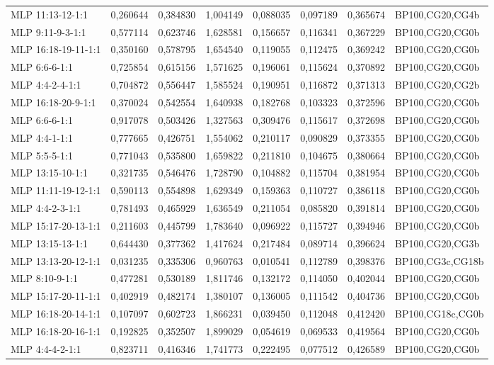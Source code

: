 \documentclass[10pt,oneside]{memoir}
\begin{document}
\begin{table}[htbp]
\begin{minipage}{\linewidth}
\begin{tabulary}{\linewidth}{@{}l@{}l@{}l@{}l@{}l@{}l@{}l@{}l@{}}
MLP 11:13-12-1:1&0,260644&0,384830&1,004149&0,088035&0,097189&0,365674&BP100,CG20,CG4b \\
MLP 9:11-9-3-1:1&0,577114&0,623746&1,628581&0,156657&0,116341&0,367229&BP100,CG20,CG0b \\
MLP 16:18-19-11-1:1&0,350160&0,578795&1,654540&0,119055&0,112475&0,369242&BP100,CG20,CG0b \\
MLP 6:6-6-1:1&0,725854&0,615156&1,571625&0,196061&0,115624&0,370892&BP100,CG20,CG0b \\
MLP 4:4-2-4-1:1&0,704872&0,556447&1,585524&0,190951&0,116872&0,371313&BP100,CG20,CG2b \\
MLP 16:18-20-9-1:1&0,370024&0,542554&1,640938&0,182768&0,103323&0,372596&BP100,CG20,CG0b \\
MLP 6:6-6-1:1&0,917078&0,503426&1,327563&0,309476&0,115617&0,372698&BP100,CG20,CG0b \\
MLP 4:4-1-1:1&0,777665&0,426751&1,554062&0,210117&0,090829&0,373355&BP100,CG20,CG0b \\
MLP 5:5-5-1:1&0,771043&0,535800&1,659822&0,211810&0,104675&0,380664&BP100,CG20,CG0b \\
MLP 13:15-10-1:1&0,321735&0,546476&1,728790&0,104882&0,115704&0,381954&BP100,CG20,CG0b \\
MLP 11:11-19-12-1:1&0,590113&0,554898&1,629349&0,159363&0,110727&0,386118&BP100,CG20,CG0b \\
MLP 4:4-2-3-1:1&0,781493&0,465929&1,636549&0,211054&0,085820&0,391814&BP100,CG20,CG0b \\
MLP 15:17-20-13-1:1&0,211603&0,445799&1,783640&0,096922&0,115727&0,394946&BP100,CG20,CG0b \\
MLP 13:15-13-1:1&0,644430&0,377362&1,417624&0,217484&0,089714&0,396624&BP100,CG20,CG3b \\
MLP 13:13-20-12-1:1&0,031235&0,335306&0,960763&0,010541&0,112789&0,398376&BP100,CG3c,CG18b \\
MLP 8:10-9-1:1&0,477281&0,530189&1,811746&0,132172&0,114050&0,402044&BP100,CG20,CG0b \\
MLP 15:17-20-11-1:1&0,402919&0,482174&1,380107&0,136005&0,111542&0,404736&BP100,CG20,CG0b \\
MLP 16:18-20-14-1:1&0,107097&0,602723&1,866231&0,039450&0,112048&0,412420&BP100,CG18c,CG0b \\
MLP 16:18-20-16-1:1&0,192825&0,352507&1,899029&0,054619&0,069533&0,419564&BP100,CG20,CG0b \\
MLP 4:4-4-2-1:1&0,823711&0,416346&1,741773&0,222495&0,077512&0,426589&BP100,CG20,CG0b \\

\end{tabulary}
\end{minipage}
\end{table}
\end{document}
